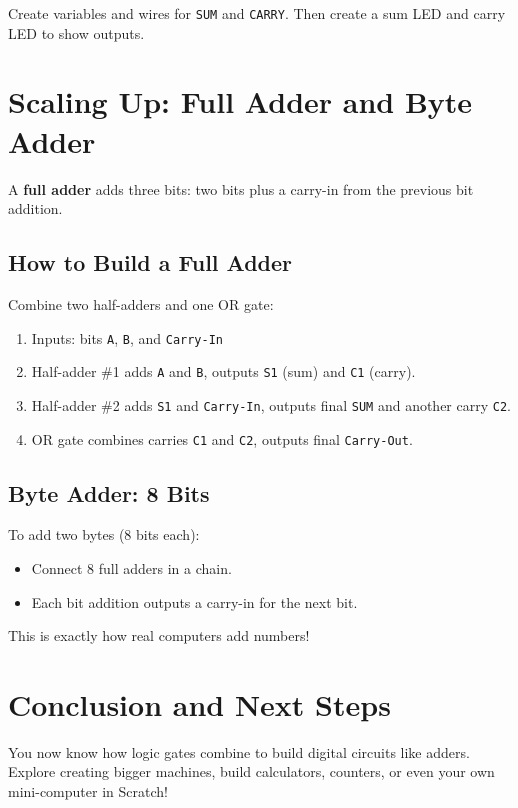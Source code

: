 \documentclass[12pt]{article}
\begin{document}
Create variables and wires for \texttt{SUM} and \texttt{CARRY}. Then create a sum LED and carry LED to show outputs.

\section*{Scaling Up: Full Adder and Byte Adder}

A \textbf{full adder} adds three bits: two bits plus a carry-in from the previous bit addition.

\subsection*{How to Build a Full Adder}

Combine two half-adders and one OR gate:
\begin{enumerate}
    \item Inputs: bits \texttt{A}, \texttt{B}, and \texttt{Carry-In}
    \item Half-adder \#1 adds \texttt{A} and \texttt{B}, outputs \texttt{S1} (sum) and \texttt{C1} (carry).
    \item Half-adder \#2 adds \texttt{S1} and \texttt{Carry-In}, outputs final \texttt{SUM} and another carry \texttt{C2}.
    \item OR gate combines carries \texttt{C1} and \texttt{C2}, outputs final \texttt{Carry-Out}.
\end{enumerate}

\subsection*{Byte Adder: 8 Bits}

To add two bytes (8 bits each):
\begin{itemize}
    \item Connect 8 full adders in a chain.
    \item Each bit addition outputs a carry-in for the next bit.
\end{itemize}

This is exactly how real computers add numbers!

\section*{Conclusion and Next Steps}
You now know how logic gates combine to build digital circuits like adders. Explore creating bigger machines, build calculators, counters, or even your own mini-computer in Scratch!
\end{document}
